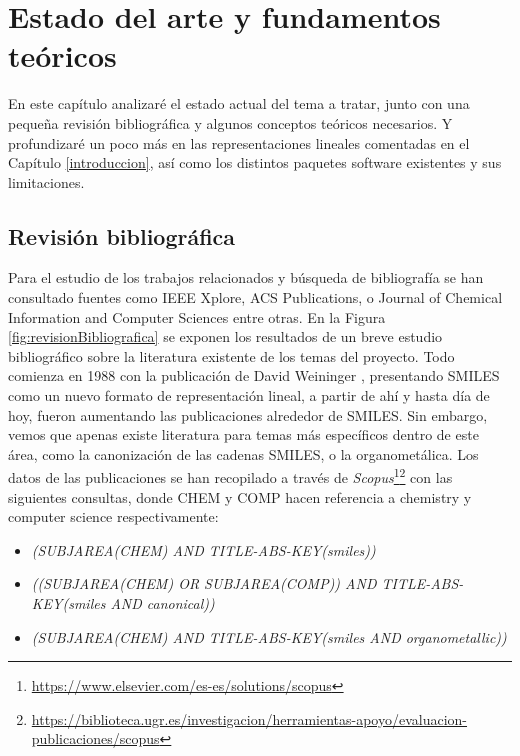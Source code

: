 
\chapter{Estado del arte y fundamentos teóricos}\label{estadoArte}

En este capítulo analizaré el estado actual del tema a tratar, junto con una pequeña revisión bibliográfica y algunos conceptos teóricos necesarios. Y profundizaré un poco más en las representaciones lineales comentadas en el Capítulo \ref{introduccion}, así como los distintos paquetes software existentes y sus limitaciones. 

\section{Revisión bibliográfica} \label{revision_bib}
Para el estudio de los trabajos relacionados y búsqueda de bibliografía se han consultado fuentes como IEEE Xplore, ACS Publications, o Journal of Chemical Information and Computer Sciences entre otras. En la Figura \ref{fig:revisionBibliografica} se exponen los resultados de un breve estudio bibliográfico sobre la literatura existente de los temas del proyecto. Todo comienza en 1988 con la publicación de David Weininger \cite{weininger_smiles_1988}, presentando SMILES como un nuevo formato de representación lineal, a partir de ahí y hasta día de hoy, fueron aumentando las publicaciones alrededor de SMILES. Sin embargo, vemos que apenas existe literatura para temas más específicos dentro de este área, como la canonización de las cadenas SMILES, o la organometálica. Los datos de las publicaciones se han recopilado a través de \textit{Scopus}\footnote{\url{https://www.elsevier.com/es-es/solutions/scopus}}\footnotecomma\footnote{\url{https://biblioteca.ugr.es/investigacion/herramientas-apoyo/evaluacion-publicaciones/scopus}} con las siguientes consultas, donde CHEM y COMP hacen referencia a chemistry y computer science respectivamente: 
\begin{itemize}
    \item {\footnotesize \textit{(SUBJAREA(CHEM) AND TITLE-ABS-KEY(smiles))}} 
    \item {\footnotesize \textit{((SUBJAREA(CHEM) OR SUBJAREA(COMP)) AND TITLE-ABS-KEY(smiles AND canonical))}}
    \item {\footnotesize \textit{(SUBJAREA(CHEM) AND TITLE-ABS-KEY(smiles AND organometallic))}}
\end{itemize}

